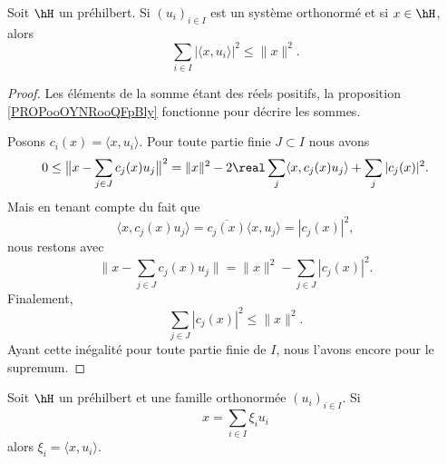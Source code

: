 \begin{proposition}    \label{PropHKqVHj}
	Soit \( \hH\) un préhilbert. Si \( (u_i)_{i\in I}\) est un système orthonormé et si \( x\in \hH\), alors
	\begin{equation}        \label{EQooWCYZooOPzGaw}
		\sum_{i\in I}\big| \langle x, u_i\rangle  \big|^2\leq \| x \|^2.
	\end{equation}
\end{proposition}

\begin{proof}
	Les éléments de la somme étant des réels positifs, la proposition \ref{PROPooOYNRooQFpBly} fonctionne pour décrire les sommes.

	Posons \( c_i(x)=\langle x, u_i\rangle \). Pour toute partie finie \( J\subset I\) nous avons
	\begin{equation}
		0\leq \big\| x-\sum_{j\in J}c_j(x)u_j \big\|^2=\| x \|^2-2\real\sum_{j}\langle x, c_j(x)u_j\rangle +\sum_j| c_j(x) |^2.
	\end{equation}
	Mais en tenant compte du fait que
	\begin{equation}
		\langle x, c_j(x)u_j\rangle =\overline{  c_j(x)}\langle x, u_j\rangle =| c_j(x) |^2,
	\end{equation}
	nous restons avec
	\begin{equation}    \label{EqvwXWEA}
		\| x-\sum_{j\in J}c_j(x)u_j \|=\| x \|^2-\sum_{j\in J}| c_j(x) |^2.
	\end{equation}
	Finalement,
	\begin{equation}
		\sum_{j\in J}| c_j(x) |^2\leq \| x \|^2.
	\end{equation}
	Ayant cette inégalité pour toute partie finie de \( I\), nous l'avons encore pour le supremum.
\end{proof}

\begin{proposition}     \label{PROPooWTOZooYZdlml}
	Soit \( \hH\) un préhilbert et une famille orthonormée \( (u_i)_{i\in I} \). Si
	\begin{equation}        \label{EqitrzXi}
		x=\sum_{i\in I}\xi_iu_i
	\end{equation}
	alors \( \xi_i=\langle x, u_i\rangle \).
\end{proposition}

